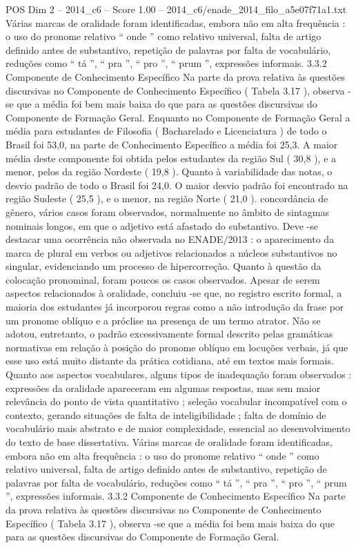 \begin{textsample}{POS Dim 2 – 2014\_c6 – Score 1.00 – 2014\_c6/enade\_2014\_filo\_a5e07f71a1.txt}
Várias marcas de oralidade foram identificadas, embora não em alta frequência : o uso do pronome relativo “ onde ” como relativo universal, falta de artigo definido antes de substantivo, repetição de palavras por falta de vocabulário, reduções como “ tá ”, “ pra ”, “ pro ”, “ prum ”, expressões informais. 3.3.2 Componente de Conhecimento Específico Na parte da prova relativa às questões discursivas no Componente de Conhecimento Específico ( Tabela 3.17 ), observa -se que a média foi bem mais baixa do que para as questões discursivas do Componente de Formação Geral.
Enquanto no Componente de Formação Geral a média para estudantes de Filosofia ( Bacharelado e Licenciatura ) de todo o Brasil foi 53,0, na parte de Conhecimento Específico a média foi 25,3.
A maior média deste componente foi obtida pelos estudantes da região Sul ( 30,8 ), e a menor, pelos da região Nordeste ( 19,8 ).
Quanto à variabilidade das notas, o desvio padrão de todo o Brasil foi 24,0.
O maior desvio padrão foi encontrado na região Sudeste ( 25,5 ), e o menor, na região Norte ( 21,0 ). concordância de gênero, vários casos foram observados, normalmente no âmbito de sintagmas nominais longos, em que o adjetivo está afastado do substantivo.
Deve -se destacar uma ocorrência não observada no ENADE/2013 : o aparecimento da marca de plural em verbos ou adjetivos relacionados a núcleos substantivos no singular, evidenciando um processo de hipercorreção.
Quanto à questão da colocação pronominal, foram poucos os casos observados.
Apesar de serem aspectos relacionados à oralidade, concluiu -se que, no registro escrito formal, a maioria dos estudantes já incorporou regras como a não introdução da frase por um pronome oblíquo e a próclise na presença de um termo atrator.
Não se adotou, entretanto, o padrão excessivamente formal descrito pelas gramáticas normativas em relação à posição do pronome oblíquo em locuções verbais, já que esse uso está muito distante da prática cotidiana, até em textos mais formais.
Quanto aos aspectos vocabulares, alguns tipos de inadequação foram observados : expressões da oralidade apareceram em algumas respostas, mas sem maior relevância do ponto de vista quantitativo ; seleção vocabular incompatível com o contexto, gerando situações de falta de inteligibilidade ; falta de domínio de vocabulário mais abstrato e de maior complexidade, essencial ao desenvolvimento do texto de base dissertativa.
Várias marcas de oralidade foram identificadas, embora não em alta frequência : o uso do pronome relativo “ onde ” como relativo universal, falta de artigo definido antes de substantivo, repetição de palavras por falta de vocabulário, reduções como “ tá ”, “ pra ”, “ pro ”, “ prum ”, expressões informais. 3.3.2 Componente de Conhecimento Específico Na parte da prova relativa às questões discursivas no Componente de Conhecimento Específico ( Tabela 3.17 ), observa -se que a média foi bem mais baixa do que para as questões discursivas do Componente de Formação Geral.

\end{textsample}
